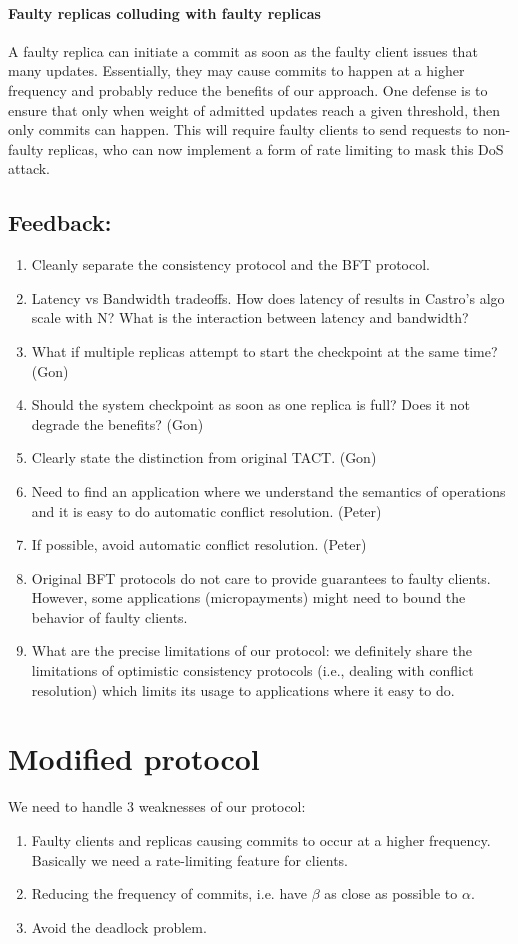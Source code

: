 \documentclass[twocolumn,10pt]{article}
\begin{document}
{\paragraph{Faulty replicas colluding with faulty replicas} A faulty replica
can initiate a commit as soon as the faulty client issues that many updates.
Essentially, they may cause commits to happen at a higher frequency and 
probably reduce the benefits of our approach. One defense is to ensure that only
when weight of admitted updates reach a given threshold, then only commits can
happen. This will require faulty clients to send requests to non-faulty replicas,
who can now implement a form of rate limiting to mask this DoS attack.

\subsection{Feedback:}
\begin{enumerate}
\item{} Cleanly separate the consistency protocol and the BFT protocol.
\item{} Latency vs Bandwidth tradeoffs. How does latency of results
in Castro's algo scale with N? What is the interaction between
latency and bandwidth? 
\item{} What if multiple replicas attempt to start the checkpoint at the same time? (Gon)
\item{} Should the system checkpoint as soon as one replica is full? Does it not
degrade the benefits? (Gon)
\item{} Clearly state the distinction from original TACT. (Gon)
\item{} Need to find an application where we understand the semantics of operations and
it is easy to do automatic conflict resolution. (Peter)
\item{} If possible, avoid automatic conflict resolution. (Peter)
\item{} Original BFT protocols do not care to provide guarantees to faulty
clients. However, some applications (micropayments) might need to bound the
behavior of faulty clients. 
\item{} What are the precise limitations of our protocol: we definitely
share the limitations of optimistic consistency protocols (i.e., dealing with
conflict resolution) which limits its usage to applications where it easy to do.
\end{enumerate}

\section{Modified protocol}
We need to handle 3 weaknesses of our protocol:
\begin{enumerate}
\item{} Faulty clients and replicas causing commits to occur at a higher
frequency. Basically we need a rate-limiting feature for clients.
\item{} Reducing the frequency of commits, i.e. have $\beta$ as close as 
possible to $\alpha$.
\item{} Avoid the deadlock problem.
\end{enumerate}

}
\end{document}
